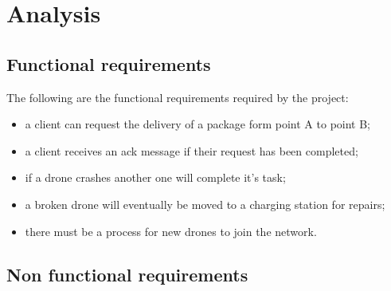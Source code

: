 \documentclass[a4paper, oneside]{memoir}
\begin{document}
\chapter{Analysis}\label{ch:analysis}


\section{Functional requirements}


The following are the functional requirements required by the project:
\begin{itemize}
\item a client can request the delivery of a package form point A to point B;
\item a client receives an ack message if their request has been completed;
\item if a drone crashes another one will complete it's task;
\item a broken drone will eventually be moved to a charging station for repairs;
\item there must be a process for new drones to join the network.
\end{itemize}

\section{Non functional requirements}

\end{document}
